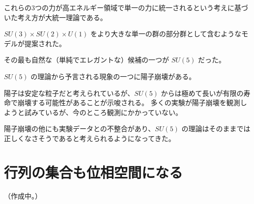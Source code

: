 \documentclass[uplatex,a4j,12pt,dvipdfmx]{jsarticle}
\begin{document}
これらの3つの力が高エネルギー領域で単一の力に統一されるという考えに基づいた考え方が大統一理論である。

$SU(3) \times SU(2) \times U(1)$
をより大きな単一の群の部分群として含むようなモデルが提案された。

その最も自然な（単純でエレガントな）候補の一つが $SU(5)$ だった。

$SU(5)$ の理論から予言される現象の一つに陽子崩壊がある。

陽子は安定な粒子だと考えられているが、$SU(5)$ からは極めて長いが有限の寿命で崩壊する可能性があることが示唆される。
多くの実験が陽子崩壊を観測しようと試みているが、今のところ観測にかかっていない。

陽子崩壊の他にも実験データとの不整合があり、$SU(5)$ の理論はそのままでは正しくなさそうであると考えられるようになってきた。



\section{行列の集合も位相空間になる}

（作成中。）
\end{document}
